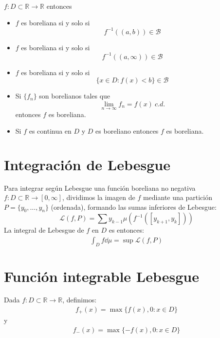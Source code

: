 \documentclass{./Calculo.tex}
\begin{document}
\begin{teorema}
	$f: D \subset  \mathbb{R} \to \mathbb{R}$ entonces 
	\begin{itemize}
		\item $f$ es boreliana si y solo si 
			\[
				f^{-1}((a,b)) \in \mathcal{B}
			\]
		\item $f$ es boreliana si y solo si 
			\[
				f^{-1}((a, \infty)) \in \mathcal{B}
			\]
		\item $f$ es boreliana si y solo si 
			\[
				\{ x \in D : f(x) < b  \} \in \mathcal{B}
			\]
		\item Si $\{ f_{n} \}$ son borelianos tales que 
			\[
				\lim_{n \to \infty} f_{n} = f(x)~c.d.
			\]
			entonces $f$ es boreliana. 
		\item Si $f$ es continua en $D$ y $D$ es boreliano entonces $f$ es boreliana.    
	\end{itemize}
\end{teorema}
\section{Integración de Lebesgue}
Para integrar según Lebesgue una función boreliana no negativa $f: D \subset \mathbb{R} \to [0,\infty]$, dividimos la imagen de $f$ mediante una partición $P = \{ y_0,\dots ,y_{n} \}$ (ordenada), formando las sumas inferiores de Lebesgue:
\[
	\mathcal{L}(f,P) = \sum y_{k-1}\mu(f^{-1}([y_{k+1},y_{k}]))
\]
La integral de Lebesgue de $f$ en $D$ es entonces:
\begin{equation}
	\begin{split}
		\int_{D}f \dd{\mu} = \sup \mathcal{L}(f,P)
	\end{split}
\end{equation}
\section{Función integrable Lebesgue}
Dada $f: D \subset \mathbb{R} \to \mathbb{R}$, definimos:
\begin{align}
	f_{+}(x) = \max \{ f(x), 0: x \in D \}
\end{align}
y
\begin{align}
	f_{-}(x) = \max \{ -f(x), 0: x \in D \}
\end{align}
\end{document}
